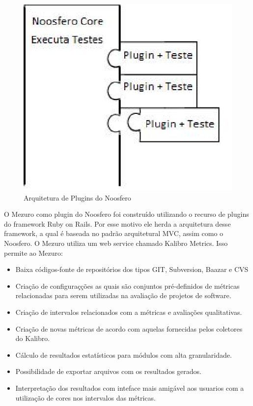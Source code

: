 \graphicspath{{figuras/}}
\begin{figure}[!htb]
\centering
\includegraphics{plugins}
\caption{Arquitetura de Plugins do Noosfero}
\label{Rotulo}
\end{figure}

O Mezuro como plugin do Noosfero foi construído utilizando o recurso de plugins do framework Ruby on Rails. Por esse motivo ele herda a arquitetura desse framework, a qual é baseada no padrão arquitetural MVC, assim como o Noosfero.
O Mezuro utiliza um web service chamado Kalibro Metrics. Isso permite ao Mezuro: 

\begin{itemize}
\item Baixa códigos-fonte de repositórios dos tipos GIT, Subversion, Baazar e CVS
\item Criação de configuraçções as quais são conjuntos pré-definidos de métricas relacionadas para serem utilizadas na avaliação de projetos de software.
\item Criação de intervalos relacionados com a métricas e avaliações qualitativas.
\item Criação de novas métricas de acordo com aquelas fornecidas pelos coletores do Kalibro.
\item Cálculo de resultados estatísticos para módulos com alta granularidade.
\item Possibilidade de exportar arquivos com os resultados gerados.
\item Interpretação dos resultados com inteface mais amigável aos usuarios com a utilização de cores nos intervalos das métricas.
\end{itemize}

